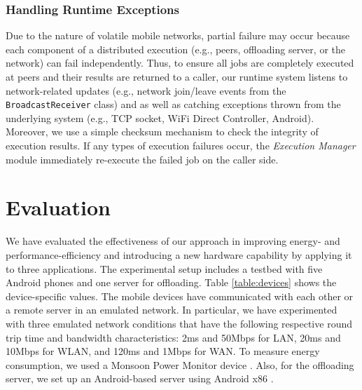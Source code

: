 \documentclass{sig-alternate}
\begin{document}
\subsubsection{Handling Runtime Exceptions}
Due to the nature of volatile mobile networks, partial failure may occur because each component of a distributed execution (e.g., peers, offloading server, or the network) can fail independently. Thus, to ensure all jobs are completely executed at peers and their results are returned to a caller, our runtime system listens to network-related updates (e.g., network join/leave events from the \texttt{BroadcastReceiver} class) and as well as catching exceptions thrown from the underlying system (e.g., TCP socket, WiFi Direct Controller, Android). Moreover, we use a simple checksum mechanism to check the integrity of execution results. If any types of execution failures occur, the \emph{Execution Manager} module immediately re-execute the failed job on the caller side.

  
\section{Evaluation}
\label{sec:eval}
We have evaluated the effectiveness of our approach in improving energy- and performance-efficiency and introducing a new hardware capability by applying it to three applications. The experimental setup includes a testbed with five Android phones and one server for offloading. Table \ref{table:devices} shows the device-specific values. The mobile devices have communicated with each other or a remote server in an emulated network. In particular, we have experimented with three emulated network conditions that have the following respective round trip time and bandwidth characteristics: 2ms and 50Mbps for LAN, 20ms and 10Mbps for WLAN, and 120ms and 1Mbps for WAN. To measure energy consumption, we used a Monsoon Power Monitor device \cite{moosoon}. Also, for the offloading server, we set up an Android-based server using Android x86 \cite{android-x86}.
\end{document}
